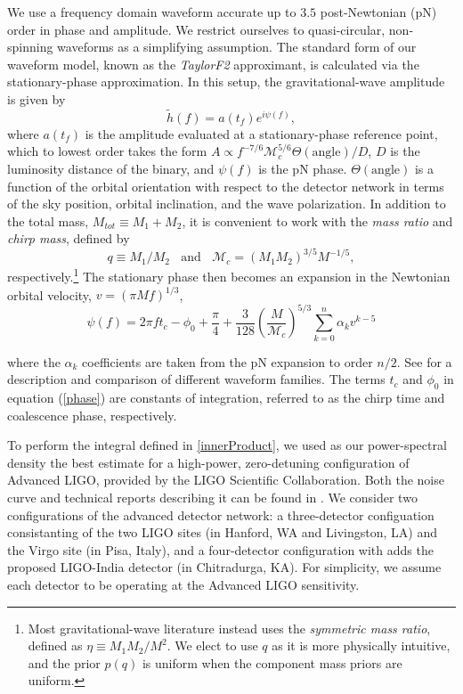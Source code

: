 \documentclass[11pt,a4paper]{emulateapj}
\newcommand{\chmass}{\mathcal{M}_c}
\begin{document}
We use a frequency domain waveform accurate up to $3.5$
post-Newtonian (pN) order in phase and amplitude.  We restrict ourselves to
quasi-circular, non-spinning waveforms as a simplifying assumption.  The standard
form of our waveform model, known as the \textit{TaylorF2}
approximant, is calculated via the stationary-phase approximation.
  In this setup, the gravitational-wave
amplitude is given by
\begin{equation}
\tilde{h}(f) = a(t_f) e^{i \psi(f)},
\label{amplitude}
\end{equation}
where $a(t_f)$ is the amplitude evaluated at a stationary-phase reference point, which to lowest order
takes the form $A \propto f^{-7/6} \chmass^{5/6}\Theta(\text{angle})/D$, $D$ is
the luminosity distance of the binary, and $\psi(f)$ is the pN phase.
$\Theta(\text{angle})$ is a function of the orbital orientation with
respect to the detector network in terms of the sky position, orbital
inclination, and the wave polarization.  In addition to the total
mass, $M_{tot}\equiv M_1+M_2$, it is convenient to work with the
\textit{mass ratio} and \textit{chirp mass}, defined by
\begin{equation}
  q\equiv M_1/M_2~~~~\text{and}~~~~\chmass = (M_1 M_2)^{3/5} M^{-1/5},
  \label{eqRatioCM}
\end{equation}
respectively.\footnote{Most gravitational-wave literature instead uses the \textit{symmetric mass ratio}, defined as $\eta \equiv M_1 M_2 / M^2$.  We elect to use $q$ as it is more physically intuitive, and the prior $p(q)$ is uniform when the component
mass priors are uniform.}  The stationary phase then becomes an expansion in the 
Newtonian orbital velocity, $v=(\pi M f)^{1/3}$, 
\begin{equation}
\psi(f) = 2 \pi f t_c - \phi_0 + \frac{\pi}{4} + \frac{3}{128}\left(\frac{M}{\chmass}\right)^{5/3}\sum^{n}_{k=0}\alpha_{k}v^{k-5}
\label{phase}
\end{equation}

\noindent where the $\alpha_{k}$ coefficients are taken from the pN expansion to order $n/2$.  See \cite{BuonannoWaveform} for a description and comparison of different waveform families.  The terms $t_c$ and $\phi_0$ in equation (\ref{phase}) are constants of integration, referred to as the chirp time and coalescence phase, respectively. 

To perform the integral defined in \eqref{innerProduct}, we used as our power-spectral
density the best estimate for a high-power, zero-detuning configuration of Advanced 
LIGO, provided by the LIGO Scientific Collaboration.  Both the noise curve and technical 
reports describing it can be found in \cite{ADVLIGONoise}.
We consider two configurations of the advanced detector
network: a three-detector configuation consistanting of the two LIGO sites 
(in Hanford, WA and Livingston, LA) and the Virgo site (in Pisa, Italy), and a 
four-detector configuration with adds the proposed LIGO-India detector
(in Chitradurga, KA).  For simplicity, we assume each detector to be 
operating at the Advanced LIGO sensitivity. 
\end{document}
